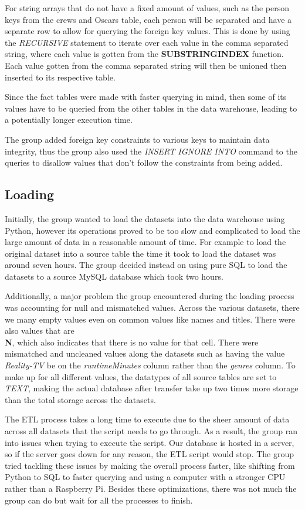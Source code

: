 For string arrays that do not have a fixed amount of values, such as the person keys from the crews and Oscars table, each person will be separated and have a separate row to allow for querying the foreign key values. This is done by using the \textit{RECURSIVE} statement to iterate over each value in the comma separated string, where each value is gotten from the \textbf{SUBSTRING\textunderscore INDEX} function. Each value gotten from the comma separated string will then be unioned then inserted to its respective table.

Since the fact tables were made with faster querying in mind, then some of its values have to be queried from the other tables in the data warehouse, leading to a potentially longer execution time.

The group added foreign key constraints to various keys to maintain data integrity, thus the group also used the \textit{INSERT IGNORE INTO} command to the queries to disallow values that don't follow the constraints from being added.

\subsection{Loading}
Initially, the group wanted to load the datasets into the data warehouse using Python, however its operations proved to be too slow and complicated to load the large amount of data in a reasonable amount of time. For example to load the original dataset into a source table the time it took to load the dataset was around seven hours. The group decided instead on using pure SQL to load the datasets to a source MySQL database which took two hours.

Additionally, a major problem the group encountered during the loading process was accounting for null and mismatched values. Across the various datasets, there we many empty values even on common values like names and titles. There were also values that are \textbf{\\N}, which also indicates that there is no value for that cell. There were mismatched and uncleaned values along the datasets such as having the value \textit{Reality-TV} be on the \textit{runtimeMinutes} column rather than the \textit{genres} column. To make up for all different values, the datatypes of all source tables are set to \textit{TEXT}, making the actual database after transfer take up two times more storage than the total storage across the datasets. 

The ETL process takes a long time to execute due to the sheer amount of data across all datasets that the script needs to go through. As a result, the group ran into issues when trying to execute the script. Our database is hosted in a server, so if the server goes down for any reason, the ETL script would stop. The group tried tackling these issues by making the overall process faster, like shifting from Python to SQL to faster querying and using a computer with a stronger CPU rather than a Raspberry Pi. Besides these optimizations, there was not much the group can do but wait for all the processes to finish.
